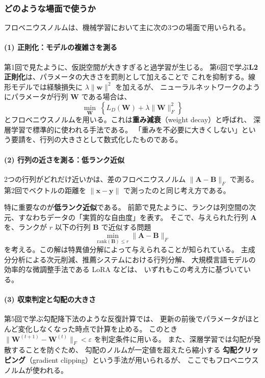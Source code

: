 \subsubsection{どのような場面で使うか}

フロベニウスノルムは、機械学習において主に次の3つの場面で用いられる。

\paragraph{(1) 正則化：モデルの複雑さを測る}
第1回で見たように、仮説空間が大きすぎると過学習が生じる。
第6回で学ぶ\textbf{L2正則化}は、パラメータの大きさを罰則として加えることで
これを抑制する。線形モデルでは経験損失に $\lambda \|\bm{w}\|^2$ を加えるが、
ニューラルネットワークのようにパラメータが行列 $\bm{W}$ である場合は、
\begin{equation}
  \min_{\bm{W}} \; \left\{ L_D(\bm{W}) + \lambda \|\bm{W}\|_F^2 \right\}
\end{equation}
とフロベニウスノルムを用いる。これは\textbf{重み減衰}（weight decay）と呼ばれ、
深層学習で標準的に使われる手法である。
「重みを不必要に大きくしない」という要請を、行列の大きさとして数式化したものである。

\paragraph{(2) 行列の近さを測る：低ランク近似}
2つの行列がどれだけ近いかは、差のフロベニウスノルム $\|\bm{A} - \bm{B}\|_F$ で測る。
第2回でベクトルの距離を $\|\bm{x} - \bm{y}\|$ で測ったのと同じ考え方である。

特に重要なのが\textbf{低ランク近似}である。
前節で見たように、ランクは列空間の次元、すなわちデータの「実質的な自由度」を表す。
そこで、与えられた行列 $\bm{A}$ を、ランクが $r$ 以下の行列 $\bm{B}$ で近似する問題
\begin{equation}
  \min_{\mathrm{rank}(\bm{B}) \leq r} \|\bm{A} - \bm{B}\|_F
\end{equation}
を考える。この解は特異値分解によって与えられることが知られている。
主成分分析による次元削減、推薦システムにおける行列分解、
大規模言語モデルの効率的な微調整手法である LoRA などは、
いずれもこの考え方に基づいている。

\paragraph{(3) 収束判定と勾配の大きさ}
第5回で学ぶ勾配降下法のような反復計算では、
更新の前後でパラメータがほとんど変化しなくなった時点で計算を止める。
このとき $\|\bm{W}^{(t+1)} - \bm{W}^{(t)}\|_F < \varepsilon$ を判定条件に用いる。
また、深層学習では勾配が発散することを防ぐため、
勾配のノルムが一定値を超えたら縮小する
\textbf{勾配クリッピング}（gradient clipping）という手法が用いられるが、
ここでもフロベニウスノルムが使われる。

